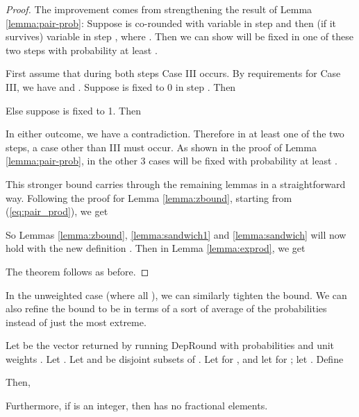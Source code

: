 \begin{proof}
The improvement comes from strengthening the result of Lemma \ref{lemma:pair-prob}: Suppose  is co-rounded with variable  in step  and then (if it survives) variable  in step , where . Then we can show  will be fixed in one of these two steps with probability at least .


First assume that during both steps Case III occurs. 
By requirements for Case III, we have  and . 
Suppose  is fixed to 0 in step . Then 
 
Else suppose  is fixed to 1. Then


In either outcome, we have a contradiction. Therefore in at least one of the two steps, a case other than III must occur. As shown in the proof of Lemma \ref{lemma:pair-prob}, in the other 3 cases  will be fixed with probability at least .

This stronger bound carries through the remaining lemmas in a straightforward way. Following the proof for Lemma \ref{lemma:zbound}, starting from (\ref{eq:pair_prod}), we get

So Lemmas \ref{lemma:zbound}, \ref{lemma:sandwich1} and \ref{lemma:sandwich} will now hold with the new definition . Then in Lemma \ref{lemma:exprod}, we get

The theorem follows as before.
\end{proof}

In the unweighted case (where all ), we can similarly tighten the bound. We can also refine the bound to be in terms of a sort of average of the probabilities instead of just the most extreme. 
\begin{theorem}
\label{thm:limited-dep-unweighted}
Let  be the vector returned by running {\sc DepRound} with probabilities  and unit weights . Let . Let  and  be disjoint subsets of .  Let  for , and let  for ; let
. Define
 
Then,

Furthermore, if  is an integer, then  has no fractional elements.
\end{theorem}

